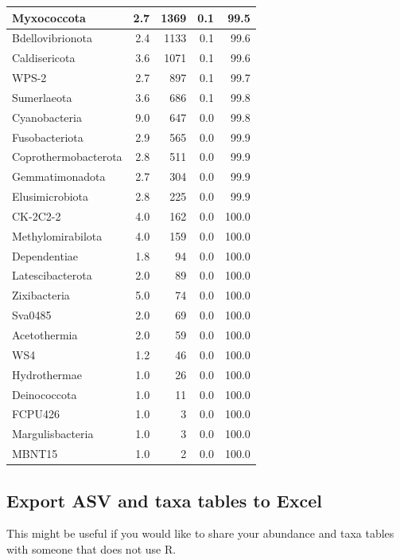 \documentclass[
]{book}
\begin{document}
\begin{table}
\begin{tabular}{l|r|r|r|r}
\hline
Myxococcota & 2.7 & 1369 & 0.1 & 99.5\\
\hline
Bdellovibrionota & 2.4 & 1133 & 0.1 & 99.6\\
\hline
Caldisericota & 3.6 & 1071 & 0.1 & 99.6\\
\hline
WPS-2 & 2.7 & 897 & 0.1 & 99.7\\
\hline
Sumerlaeota & 3.6 & 686 & 0.1 & 99.8\\
\hline
Cyanobacteria & 9.0 & 647 & 0.0 & 99.8\\
\hline
Fusobacteriota & 2.9 & 565 & 0.0 & 99.9\\
\hline
Coprothermobacterota & 2.8 & 511 & 0.0 & 99.9\\
\hline
Gemmatimonadota & 2.7 & 304 & 0.0 & 99.9\\
\hline
Elusimicrobiota & 2.8 & 225 & 0.0 & 99.9\\
\hline
CK-2C2-2 & 4.0 & 162 & 0.0 & 100.0\\
\hline
Methylomirabilota & 4.0 & 159 & 0.0 & 100.0\\
\hline
Dependentiae & 1.8 & 94 & 0.0 & 100.0\\
\hline
Latescibacterota & 2.0 & 89 & 0.0 & 100.0\\
\hline
Zixibacteria & 5.0 & 74 & 0.0 & 100.0\\
\hline
Sva0485 & 2.0 & 69 & 0.0 & 100.0\\
\hline
Acetothermia & 2.0 & 59 & 0.0 & 100.0\\
\hline
WS4 & 1.2 & 46 & 0.0 & 100.0\\
\hline
Hydrothermae & 1.0 & 26 & 0.0 & 100.0\\
\hline
Deinococcota & 1.0 & 11 & 0.0 & 100.0\\
\hline
FCPU426 & 1.0 & 3 & 0.0 & 100.0\\
\hline
Margulisbacteria & 1.0 & 3 & 0.0 & 100.0\\
\hline
MBNT15 & 1.0 & 2 & 0.0 & 100.0\\
\hline
\end{tabular}
\endgroup{}
\end{table}

\hypertarget{export-asv-and-taxa-tables-to-excel}{%
\subsection{Export ASV and taxa tables to Excel}\label{export-asv-and-taxa-tables-to-excel}}

This might be useful if you would like to share your abundance and taxa tables with someone that does not use R.
\end{document}
